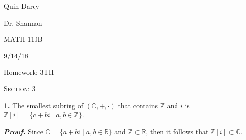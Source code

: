 \documentclass[12pt, a4paper]{article}
\begin{document}
  
 \begin{flushleft}
  
    Quin Darcy\par
    Dr. Shannon\par
    MATH 110B\par
    9/14/18
  
 \end{flushleft}
  
 \centerline{Homework: 3TH}
 
 \vspace{4mm}
 
 \noindent\textsc{Section: 3}\par
 
 \justifying
 
 \vspace{1mm}
 
 \hline
 
 \vspace{4mm}
 
 \noindent\textbf{1.} The smallest subring of $(\mathbb{C}, +,\cdot)$ that contains $\mathbb{Z}$ and $i$ is $\mathbb{Z}[i]=\{a+bi\mid a,b\in\mathbb{Z}\}$.\par
 
 \vspace{4mm}
 
 \begin{addmargin}[1.5em]{1.5em}
 
    \noindent\textbf{\textit{Proof.}} Since $\mathbb{C}=\{a+bi\mid a,b\in\mathbb{R}\}$ and $\mathbb{Z}\subset\mathbb{R}$, then it follows that $\mathbb{Z}[i]\subset\mathbb{C}$.
 
 \end{addmargin}
 
 
 
\end{document}
